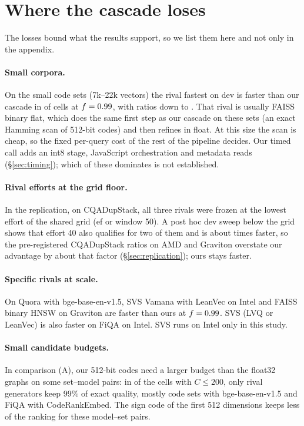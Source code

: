\section{Where the cascade loses}\label{sec:losses}

The losses bound what the results support, so we list them here and not only in the appendix.

\paragraph{Small corpora.} On the small code sets (7k--22k vectors) the rival fastest on dev is faster
than our cascade in  of  cells at $f = 0.99$, with ratios down to
. That rival is usually FAISS binary flat, which does the same first step as our cascade
on these sets (an exact Hamming scan of 512-bit codes) and then refines in float. At this size the scan
is cheap, so the fixed per-query cost of the rest of the pipeline decides. Our timed call adds an int8
stage, JavaScript orchestration and metadata reads (\S\ref{sec:timing}); which of these dominates is not
established.

\paragraph{Rival efforts at the grid floor.} In the replication, on CQADupStack, all three rivals were frozen at
the lowest effort of the shared grid (ef or window 50). A post hoc dev sweep below the grid shows that effort 40 also
qualifies for two of them and is about  times faster, so the pre-registered CQADupStack ratios on AMD
and Graviton overstate our advantage by about that factor (\S\ref{sec:replication}); ours stays faster.

\paragraph{Specific rivals at scale.} On Quora with bge-base-en-v1.5, SVS Vamana with LeanVec on Intel and
FAISS binary HNSW on Graviton are faster than ours at $f = 0.99$. SVS (LVQ or LeanVec) is also faster on
FiQA on Intel. SVS runs on Intel only in this study.

\paragraph{Small candidate budgets.} In comparison (A), our 512-bit codes need a larger budget than the
float32 graphs on some set--model pairs: in  of the  cells with
$C \le 200$, only rival generators keep 99\% of exact quality, mostly code sets with bge-base-en-v1.5
and FiQA with CodeRankEmbed. The sign code of the first 512 dimensions keeps less of the ranking for
these model--set pairs.

